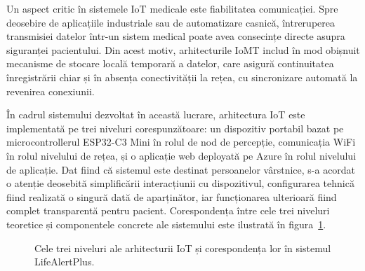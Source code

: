 \documentclass[12pt,a4paper,twoside]{article}
\begin{document}
Un aspect critic în sistemele IoT medicale este fiabilitatea comunicației. Spre deosebire de aplicațiile industriale sau de automatizare casnică, întreruperea transmisiei datelor într-un sistem medical poate avea consecințe directe asupra siguranței pacientului. Din acest motiv, arhitecturile IoMT includ în mod obișnuit mecanisme de stocare locală temporară a datelor, care asigură continuitatea înregistrării chiar și în absența conectivității la rețea, cu sincronizare automată la revenirea conexiunii.

În cadrul sistemului dezvoltat în această lucrare, arhitectura IoT este implementată pe trei niveluri corespunzătoare: un dispozitiv portabil bazat pe microcontrollerul ESP32-C3 Mini în rolul de nod de percepție, comunicația WiFi în rolul nivelului de rețea, și o aplicație web deployată pe Azure în rolul nivelului de aplicație. Dat fiind că sistemul este destinat persoanelor vârstnice, s-a acordat o atenție deosebită simplificării interacțiunii cu dispozitivul, configurarea tehnică fiind realizată o singură dată de aparținător, iar funcționarea ulterioară fiind complet transparentă pentru pacient. Corespondența între cele trei niveluri teoretice și componentele concrete ale sistemului este ilustrată în figura~\ref{fig:iot-layers}.

\begin{figure}[H]
\centering
{}
\caption{Cele trei niveluri ale arhitecturii IoT și corespondența lor în sistemul LifeAlertPlus.}
\label{fig:iot-layers}
\end{figure}
\end{document}
